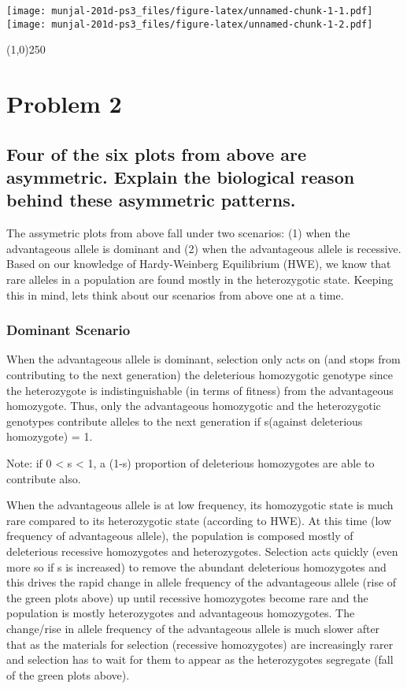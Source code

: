 \documentclass[]{article}
\begin{document}
\texttt{[image: munjal-201d-ps3\_files/figure-latex/unnamed-chunk-1-1.pdf]}
\texttt{[image: munjal-201d-ps3\_files/figure-latex/unnamed-chunk-1-2.pdf]}

\begin{center}
\line(1,0){250}
\end{center}

\pagebreak

\section{Problem 2}\label{problem-2}

\subsection{Four of the six plots from above are asymmetric. Explain the
biological reason behind these asymmetric
patterns.}\label{four-of-the-six-plots-from-above-are-asymmetric.-explain-the-biological-reason-behind-these-asymmetric-patterns.}

The assymetric plots from above fall under two scenarios: (1) when the
advantageous allele is dominant and (2) when the advantageous allele is
recessive. Based on our knowledge of Hardy-Weinberg Equilibrium (HWE),
we know that rare alleles in a population are found mostly in the
heterozygotic state. Keeping this in mind, lets think about our
scenarios from above one at a time.

\subsubsection{Dominant Scenario}\label{dominant-scenario}

When the advantageous allele is dominant, selection only acts on (and
stops from contributing to the next generation) the deleterious
homozygotic genotype since the heterozygote is indistinguishable (in
terms of fitness) from the advantageous homozygote. Thus, only the
advantageous homozygotic and the heterozygotic genotypes contribute
alleles to the next generation if s(against deleterious homozygote) = 1.

Note: if 0 \textless{} s \textless{} 1, a (1-s) proportion of
deleterious homozygotes are able to contribute also.

When the advantageous allele is at low frequency, its homozygotic state
is much rare compared to its heterozygotic state (according to HWE). At
this time (low frequency of advantageous allele), the population is
composed mostly of deleterious recessive homozygotes and heterozygotes.
Selection acts quickly (even more so if s is increased) to remove the
abundant deleterious homozygotes and this drives the rapid change in
allele frequency of the advantageous allele (rise of the green plots
above) up until recessive homozygotes become rare and the population is
mostly heterozygotes and advantageous homozygotes. The change/rise in
allele frequency of the advantageous allele is much slower after that as
the materials for selection (recessive homozygotes) are increasingly
rarer and selection has to wait for them to appear as the heterozygotes
segregate (fall of the green plots above).
\end{document}
